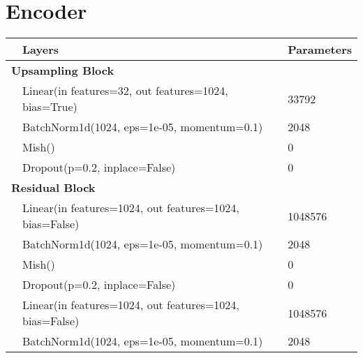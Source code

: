 \newpage
\section{Encoder}
\begin{center}
    \begin{tabular}{ p{} p{}  p{}}
                                                        & \textbf{Layers}                                         & \textbf{Parameters} \\
        \hline
        \multicolumn{2}{l}{\textbf{Upsampling Block}}   &                                                                               \\
                                                        & Linear(in features=32, out features=1024, bias=True)    & 33792               \\
                                                        & BatchNorm1d(1024, eps=1e-05, momentum=0.1)              & 2048                \\
                                                        & Mish()                                                  & 0                   \\
                                                        & Dropout(p=0.2, inplace=False)                           & 0                   \\
        \multicolumn{2}{l}{\textbf{Residual Block}}     &                                                                               \\
                                                        & Linear(in features=1024, out features=1024, bias=False) & 1048576             \\
                                                        & BatchNorm1d(1024, eps=1e-05, momentum=0.1)              & 2048                \\
                                                        & Mish()                                                  & 0                   \\
                                                        & Dropout(p=0.2, inplace=False)                           & 0                   \\
                                                        & Linear(in features=1024, out features=1024, bias=False) & 1048576             \\
                                                        & BatchNorm1d(1024, eps=1e-05, momentum=0.1)              & 2048                \\

\end{tabular}
\end{center}
